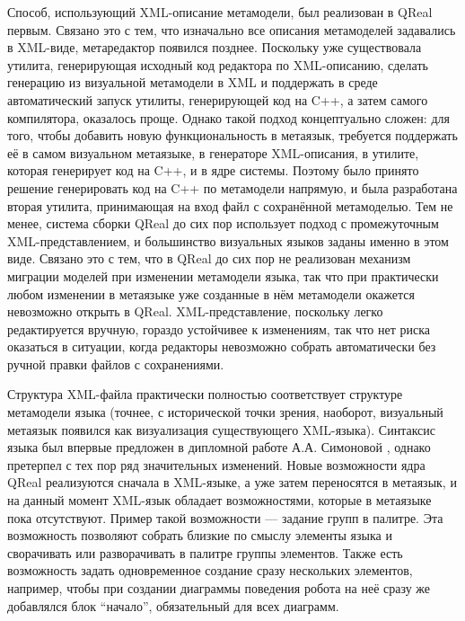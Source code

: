 Способ, использующий XML-описание метамодели, был реализован в QReal первым. Связано 
это с тем, что изначально все описания метамоделей задавались в XML-виде, метаредактор 
появился позднее. Поскольку уже существовала утилита, генерирующая исходный код редактора 
по XML-описанию, сделать генерацию из визуальной метамодели в XML и поддержать в среде 
автоматический запуск утилиты, генерирующей код на C++, а затем самого компилятора, 
оказалось проще. Однако такой подход концептуально сложен: для того, чтобы добавить 
новую функциональность в метаязык, требуется поддержать её в самом визуальном метаязыке, 
в генераторе XML-описания, в утилите, которая генерирует код на C++, и в ядре системы. 
Поэтому было принято решение генерировать код на C++ по метамодели напрямую, и была 
разработана вторая утилита,  принимающая на вход файл с сохранённой метамоделью. Тем 
не менее, система сборки QReal до сих пор использует подход с промежуточным XML-представлением, 
и большинство визуальных языков заданы именно в этом виде. Связано это с тем, что в 
QReal до сих пор не реализован механизм миграции моделей при изменении метамодели 
языка, так что при практически любом изменении в метаязыке уже созданные в нём метамодели 
окажется невозможно открыть в QReal. XML-представление, поскольку легко редактируется 
вручную, гораздо устойчивее к изменениям, так что нет риска оказаться в ситуации, когда 
редакторы невозможно собрать автоматически без ручной правки файлов с сохранениями. 

Структура XML-файла практически полностью соответствует структуре метамодели языка 
(точнее, с исторической точки зрения, наоборот, визуальный метаязык появился как визуализация 
существующего XML-языка). Синтаксис языка был впервые предложен в дипломной работе А.А. Симоновой
, однако претерпел с тех пор ряд значительных изменений. Новые возможности ядра QReal 
реализуются сначала в XML-языке, а уже затем переносятся в метаязык, и на данный момент 
XML-язык обладает возможностями, которые в метаязыке пока отсутствуют. Пример такой 
возможности --- задание групп в палитре. Эта возможность позволяют собрать близкие 
по смыслу элементы языка и сворачивать или разворачивать в палитре группы элементов. 
Также есть возможность задать одновременное создание сразу нескольких элементов, например, 
чтобы при создании диаграммы поведения робота на неё сразу же добавлялся блок "`начало"', 
обязательный для всех диаграмм.

